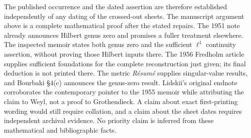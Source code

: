 The published occurrence and the dated assertion are therefore established
independently of any dating of the crossed-out sheets. The manuscript
argument above is a complete mathematical proof after the stated repairs.
The 1951 note already announces Hilbert genus zero and promises a fuller
treatment elsewhere. The inspected memoir states both genus zero and the sufficient $\ell^1$
continuity assertion, without proving those Hilbert inputs there. The
1956 Fredholm article supplies sufficient foundations for the complete
reconstruction just given; its final deduction is not printed there.
The metric \emph{R\'esum\'e} supplies singular-value results, and
Bourbaki \S4(c) announces the genus-zero result. Lidskii's original endnote
corroborates the contemporary pointer to the 1955 memoir while attributing
the claim to Weyl, not a proof to Grothendieck. A claim about exact
first-printing wording would still require collation, and a claim about
the sheet dates requires independent archival evidence. No priority claim
is inferred from these mathematical and bibliographic facts.
